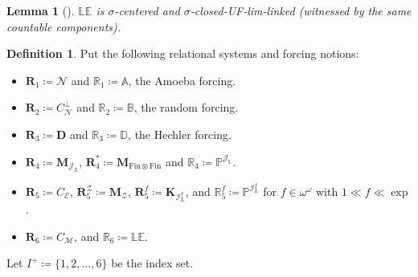 \documentclass[a4paper,12pt]{amsart}
\newtheorem{lem}[thm]{Lemma}
\theoremstyle{definition}
\newtheorem{dfn}[thm]{Definition}
\numberwithin{thm}{section}
\numberwithin{equation}{section}
\newcommand{\br}{\mathbb{R}}
\newcommand{\oo}{{\omega}^\omega}
\newcommand{\m}{\mathcal{M}}
\newcommand{\n}{\mathcal{N}}
\newcommand{\R}{\mathbf{R}}
\newcommand{\lebb}{\mathbb{LE}}
\newcommand{\I}{\mathscr{I}}
\newcommand{\J}{\mathscr{J}}
\newcommand{\dif}{\mathbb{P}^{\I_L^f}}
\newcommand{\finfin}{\mathrm{Fin}\otimes\mathrm{Fin}}
\newcommand{\Z}{\mathcal{Z}}
\newcommand{\posetJL}{\mathbb{P}^{\J_L}}
\begin{document}
    \begin{lem}[{\cite[Lemma 4.27,4.29]{Yam24}}]
    \label{lem:lebb_sigma_centered_cUF}
        $\lebb$ is $\sigma$-centered and $\sigma$-closed-UF-lim-linked (witnessed by the same countable components).
    \end{lem}

    \begin{dfn}
		Put the following relational systems and forcing notions:
		\begin{itemize}
			\item $\R_1\coloneq\n$ and $\br_1\coloneq\mathbb{A}$, the Amoeba forcing.
			\item $\R_2\coloneq C_\n^\bot$ and $\br_2\coloneq\mathbb{B}$, the random forcing.
			\item $\R_3\coloneq\mathbf{D}$ and $\br_3\coloneq\mathbb{D}$, the Hechler forcing.
			\item $\R_4\coloneq\mathbf{M}_{\J_L}$, $\R_4^*\coloneq\mathbf{M}_{\finfin}$ and $\br_4\coloneq\mathbb{\posetJL}$.
			\item $\R_5\coloneq C_\mathcal{E}$, $\R_5^{\Z}\coloneqq \mathbf{M}_{\Z}$, $\R_5^f\coloneq \mathbf{K}_{\I_L^f}$, and $\br_5^f\coloneq\dif$ for $f\in\oo$ with $1\ll f\ll\exp$.
			\item $\R_6\coloneq C_\m$, and $\br_6\coloneq\lebb$.
		\end{itemize}
		Let $I^+\coloneq \{1,2,\ldots,6\}$ be the index set.
	\end{dfn}
        
\end{document}

